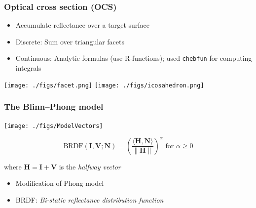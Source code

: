 \documentclass{beamer}
\begin{document}
\begin{frame}[fragile]
\frametitle{Optical cross section (OCS)}
\begin{itemize}
\item Accumulate reflectance over a target surface
\item Discrete: Sum over triangular facets 
\item Continuous: Analytic formulas (use R-functions); 
used \verb+chebfun+ for computing integrals
\end{itemize}
\centerline{\texttt{[image: ./figs/facet.png]} \: \texttt{[image: ./figs/icosahedron.png]}}
\end{frame}

\begin{frame}[t]
\frametitle{The Blinn--Phong model}
\centerline{\texttt{[image: ./figs/ModelVectors]}}
\begin{tcolorbox}
$$\text{BRDF}(\mathbf{I},\mathbf{V};\mathbf{N}) = \left(\frac{\langle\mathbf{H},\mathbf{N}\rangle}{\|\mathbf{H}\|}\right)^\alpha \text{ for } \alpha \geq 0$$
\centerline{where $\mathbf{H} = \mathbf{I} + \mathbf{V}$ is the \textit{halfway vector}}
\end{tcolorbox}
\begin{itemize}
\item Modification of Phong model
\item BRDF: \textit{Bi-static reflectance distribution function}
\end{itemize}
\end{frame}
\end{document}
